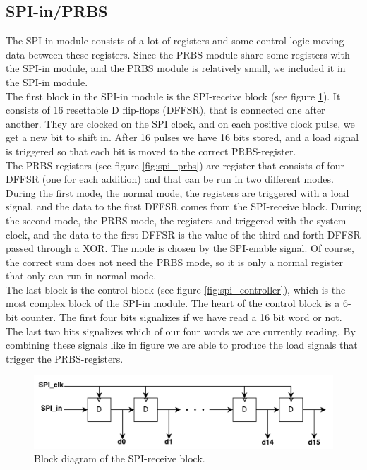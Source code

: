 
\subsection{SPI-in/PRBS}
The SPI-in module consists of a lot of registers and some control logic moving data between these registers. Since the PRBS module share some registers with the SPI-in module, and the PRBS module is relatively small, we included it in the SPI-in module. \\
The first block in the SPI-in module is the SPI-receive block (see figure \ref{fig:spi_receive}). It consists of 16 resettable D flip-flops (DFFSR), that is connected one after another. They are clocked on the SPI clock, and on each positive clock pulse, we get a new bit to shift in. After 16 pulses we have 16 bits stored, and a load signal is triggered so that each bit is moved to the correct PRBS-register. \\
The PRBS-registers (see figure \ref{fig:spi_prbs}) are register that consists of four DFFSR (one for each addition) and that can be run in two different modes. During the first mode, the normal mode, the registers are triggered with a load signal, and the data to the first DFFSR comes from the SPI-receive block. During the second mode, the PRBS mode, the registers and triggered with the system clock, and the data to the first DFFSR is the value of the third and forth DFFSR passed through a XOR. The mode is chosen by the SPI-enable signal. Of course, the correct sum does not need the PRBS mode, so it is only a normal register that only can run in normal mode.\\
The last block is the control block (see figure \ref{fig:spi_controller}), which is the most complex block of the SPI-in module. The heart of the control block is a 6-bit counter. The first four bits signalizes if we have read a 16 bit word or not. The last two bits signalizes which of our four words we are currently reading. By combining these signals like in figure we are able to produce the load signals that trigger the PRBS-registers.

\begin{figure}[H]
	\centering
	\captionsetup{justification=centering}
	\includegraphics[scale=0.5]{../figures/SPI_receive.pdf}
	\caption{Block diagram of the SPI-receive block.} \label{fig:spi_receive}
\end{figure}

